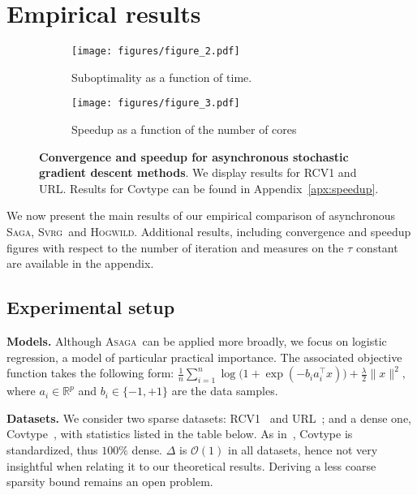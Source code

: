 \documentclass[twoside]{article}
\newcommand{\overlap}{\tau}
\newcommand{\sparsity}{\Delta}
\newcommand{\ASAGA}{\textsc{Asaga}}
\newcommand{\SAGA}{\textsc{Saga}}
\newcommand{\SVRG}{\textsc{Svrg}}
\newcommand{\Hogwild}{\textsc{Hogwild}}
\begin{document}
\section{Empirical results}\label{sec:results}
\begin{figure*}[ttt!]
	\centering
	\begin{subfigure}[t]{0.48\linewidth}
		\centering
		\texttt{[image: figures/figure\_2.pdf]}
		\caption{Suboptimality as a function of time.}
		\label{fig:fig_2}
	\end{subfigure}
	\hfill
	\begin{subfigure}[t]{0.48\linewidth}
		\centering
		\texttt{[image: figures/figure\_3.pdf]}
		\caption{Speedup as a function of the number of cores}
		\label{fig:fig_3}
	\end{subfigure}
	\caption{ {\bf Convergence and speedup for asynchronous stochastic gradient descent methods}.
		We display results for RCV1 and URL. Results for Covtype can be found in Appendix~\ref{apx:speedup}. } 
	\vspace{-3.5mm}
\end{figure*}
\vspace{-2mm}
We now present the main results of our empirical comparison of asynchronous \SAGA , \SVRG\ and \Hogwild. 
Additional results, including convergence and speedup figures with respect to the number of iteration and measures on the $\overlap$ constant are available in the appendix.
\vspace{-6mm}
\subsection{Experimental setup}\label{ImplDetails}
\vspace{-2mm}
{\bf Models.} 
Although \ASAGA\ can be applied more broadly, we focus on logistic regression, a model of particular practical importance. 
The associated objective function takes the following form:
$
{\frac{1}{n} \sum_{i=1}^n \log\big(1 + \exp(- b_i a_i^\intercal x)\big)} + \frac{\lambda}{2} \|x\|^2,
$
where $a_i \in \mathbb{R}^p$ and $b_i \in \{-1,+1\}$ are the data samples.

{\bf Datasets.}
We consider two sparse datasets: RCV1~\citep{RCV1} and URL~\citep{URL}; and a dense one, Covtype~\citep{Covtype}, with statistics listed in the table below. 
As in~\citet{SAG}, Covtype is standardized, thus $100\%$ dense.  
$\sparsity$ is $\mathcal{O}(1)$ in all datasets, hence not very insightful when relating it to our theoretical results.
Deriving a less coarse sparsity bound remains an open problem.
\end{document}
